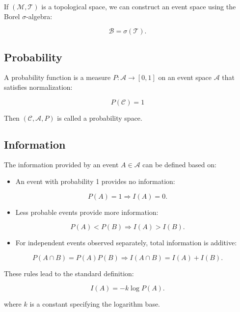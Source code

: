 \documentclass[12pt]{article}
\begin{document}
If $(\mathcal{M}, \mathcal{T})$ is a topological space, we can construct an event space using the Borel $\sigma$-algebra:

\begin{equation}
\mathcal{B} = \sigma(\mathcal{T}).
\end{equation}
\subsection*{Probability}

A probability function is a measure $P: \mathcal{A} \rightarrow [0,1]$ on an event space $\mathcal{A}$ that satisfies normalization:

\begin{equation}
P(\mathcal{C}) = 1
\end{equation}

Then $(\mathcal{C}, \mathcal{A}, P)$ is called a probability space.
\subsection*{Information}

The information provided by an event $A \in \mathcal{A}$ can be defined based on:

\begin{itemize}
  \item An event with probability 1 provides no information:
\end{itemize}
\begin{equation}
P(A) = 1 \Rightarrow I(A) = 0.
\end{equation}

\begin{itemize}
  \item Less probable events provide more information:
\end{itemize}
\begin{equation}
P(A) < P(B) \Rightarrow I(A) > I(B).
\end{equation}

\begin{itemize}
  \item For independent events observed separately, total information is additive:
\end{itemize}
\begin{equation}
P(A \cap B) = P(A) P(B) \Rightarrow I(A \cap B) = I(A) + I(B).
\end{equation}

These rules lead to the standard definition:

\begin{equation}
I(A) = -k \log P(A).
\end{equation}

where $k$ is a constant specifying the logarithm base.
\end{document}
